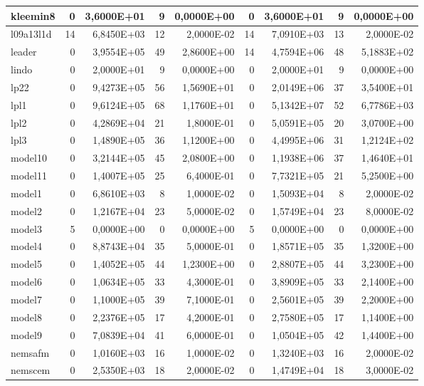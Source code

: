 \begin{tabular}{|l|r|r|r|r|r|r|r|r|}
kleemin8 & 0 & 3,6000E+01 & 9 & 0,0000E+00 & 0 & 3,6000E+01 & 9 & 0,0000E+00 \\ \hline
l09a13l1d & 14 & 6,8450E+03 & 12 & 2,0000E-02 & 14 & 7,0910E+03 & 13 & 2,0000E-02 \\ \hline
leader & 0 & 3,9554E+05 & 49 & 2,8600E+00 & 14 & 4,7594E+06 & 48 & 5,1883E+02 \\ \hline
lindo & 0 & 2,0000E+01 & 9 & 0,0000E+00 & 0 & 2,0000E+01 & 9 & 0,0000E+00 \\ \hline
lp22 & 0 & 9,4273E+05 & 56 & 1,5690E+01 & 0 & 2,0149E+06 & 37 & 3,5400E+01 \\ \hline
lpl1 & 0 & 9,6124E+05 & 68 & 1,1760E+01 & 0 & 5,1342E+07 & 52 & 6,7786E+03 \\ \hline
lpl2 & 0 & 4,2869E+04 & 21 & 1,8000E-01 & 0 & 5,0591E+05 & 20 & 3,0700E+00 \\ \hline
lpl3 & 0 & 1,4890E+05 & 36 & 1,1200E+00 & 0 & 4,4995E+06 & 31 & 1,2124E+02 \\ \hline
model10 & 0 & 3,2144E+05 & 45 & 2,0800E+00 & 0 & 1,1938E+06 & 37 & 1,4640E+01 \\ \hline
model11 & 0 & 1,4007E+05 & 25 & 6,4000E-01 & 0 & 7,7321E+05 & 21 & 5,2500E+00 \\ \hline
model1 & 0 & 6,8610E+03 & 8 & 1,0000E-02 & 0 & 1,5093E+04 & 8 & 2,0000E-02 \\ \hline
model2 & 0 & 1,2167E+04 & 23 & 5,0000E-02 & 0 & 1,5749E+04 & 23 & 8,0000E-02 \\ \hline
model3 & 5 & 0,0000E+00 & 0 & 0,0000E+00 & 5 & 0,0000E+00 & 0 & 0,0000E+00 \\ \hline
model4 & 0 & 8,8743E+04 & 35 & 5,0000E-01 & 0 & 1,8571E+05 & 35 & 1,3200E+00 \\ \hline
model5 & 0 & 1,4052E+05 & 44 & 1,2300E+00 & 0 & 2,8807E+05 & 44 & 3,2300E+00 \\ \hline
model6 & 0 & 1,0634E+05 & 33 & 4,3000E-01 & 0 & 3,8909E+05 & 33 & 2,1400E+00 \\ \hline
model7 & 0 & 1,1000E+05 & 39 & 7,1000E-01 & 0 & 2,5601E+05 & 39 & 2,2000E+00 \\ \hline
model8 & 0 & 2,2376E+05 & 17 & 4,2000E-01 & 0 & 2,7580E+05 & 17 & 1,1400E+00 \\ \hline
model9 & 0 & 7,0839E+04 & 41 & 6,0000E-01 & 0 & 1,0504E+05 & 42 & 1,4400E+00 \\ \hline
nemsafm & 0 & 1,0160E+03 & 16 & 1,0000E-02 & 0 & 1,3240E+03 & 16 & 2,0000E-02 \\ \hline
nemscem & 0 & 2,5350E+03 & 18 & 2,0000E-02 & 0 & 1,4749E+04 & 18 & 3,0000E-02 \\ \hline

\end{tabular}
